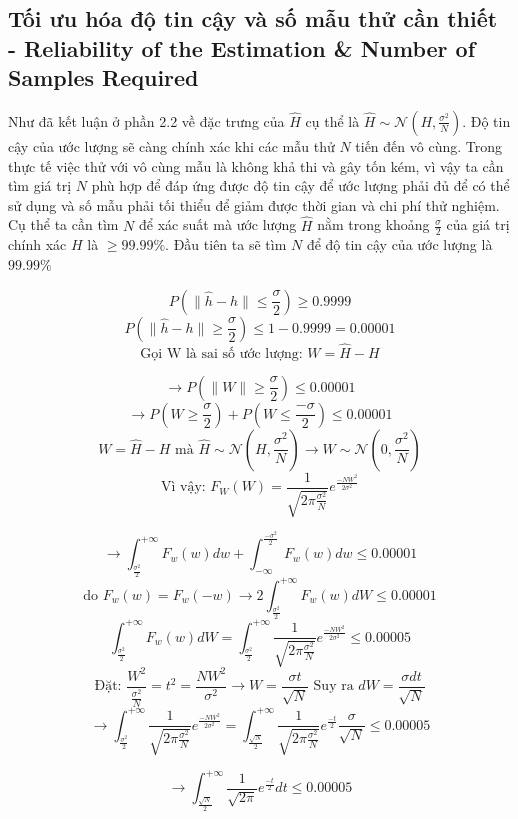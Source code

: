 \documentclass{article}
\begin{document}
\subsection{Tối ưu hóa độ tin cậy và số mẫu thử cần thiết  - Reliability of the Estimation \& Number of Samples Required}
Như đã kết luận ở phần 2.2 về đặc trưng của $\hat{H}$ cụ thể là $\hat{H} \sim \mathcal{N}(H,\frac{\sigma^2}{N})$. Độ tin cậy của ước lượng sẽ càng chính xác khi các mẫu thử $N$ tiến đến vô cùng. Trong thực tế việc thử với vô cùng mẫu là không khả thi và gây tốn kém, vì vậy ta cần tìm giá trị $N$ phù hợp để đáp ứng được độ tin cậy để ước lượng phải đủ để có thể sử dụng và số mẫu phải tối thiểu để giảm được thời gian và chi phí thử nghiệm. Cụ thể ta cần tìm $N$ để xác suất mà ước lượng $\hat{H}$ nằm trong khoảng $\frac{\sigma}{2}$ của giá trị chính xác $H$ là $\geq 99.99\%$. Đầu tiên ta sẽ tìm $N$ để độ tin cậy của ước lượng là $99.99\%$

$$P(\|\hat{h} - h\| \leq \frac{\sigma}{2}) \geq 0.9999$$
$$P(\|\hat{h} - h\| \geq \frac{\sigma}{2}) \leq 1 - 0.9999 = 0.00001$$
$$ \text{Gọi W là sai số ước lượng: } W = \hat{H} - H $$

$$\rightarrow P(\|W\| \geq \frac{\sigma}{2}) \leq 0.00001$$
$$\rightarrow P(W \geq \frac{\sigma}{2}) + P(W \leq \frac{-\sigma}{2}) \leq 0.00001$$
$$W = \hat{H} - H \text{ mà } \hat{H} \sim \mathcal{N}(H,\frac{\sigma^2}{N}) \rightarrow W \sim \mathcal{N}(0,\frac{\sigma^2}{N})$$
$$\text{Vì vậy: } F_W(W) = \frac{1}{ \sqrt{2\pi\frac{\sigma^2}{N} } } e^\frac{-NW^2}{2\sigma^2}$$

$$ \rightarrow \int_{\frac{\sigma^2}{2}}^{+\infty} F_w(w)dw + \int_{-\infty}^{\frac{-\sigma^2}{2}} F_w(w)dw \leq 0.00001$$
$$\text{do } F_w(w) = F_w(-w) \rightarrow 2\int_{\frac{\sigma^2}{2}}^{+\infty} F_w(w)dW \leq 0.00001$$
$$\int_{\frac{\sigma^2}{2}}^{+\infty} F_w(w)dW  = \int_{\frac{\sigma^2}{2}}^{+\infty}\frac{1}{ \sqrt{2\pi\frac{\sigma^2}{N} } } e^\frac{-NW^2}{2\sigma^2} \leq 0.00005$$
$$\text{Đặt: } \frac{W^2}{\frac{\sigma^2}{N}} = t^2 = \frac{NW^2}{\sigma^2} \rightarrow W = \frac{\sigma t}{\sqrt{N}} \text{ Suy ra } dW = \frac{\sigma dt}{\sqrt{N}}$$
$$\rightarrow \int_{\frac{\sigma^2}{2}}^{+\infty}\frac{1}{ \sqrt{2\pi\frac{\sigma^2}{N} } } e^\frac{-NW^2}{2\sigma^2} = \int_{\frac{\sqrt{N}}{2}}^{+\infty}\frac{1}{ \sqrt{2\pi\frac{\sigma^2}{N} } } e^\frac{-t}{2} \frac{\sigma}{\sqrt{N}} \leq 0.00005 $$

$$ \rightarrow \int_{\frac{\sqrt{N}}{2}}^{+\infty}\frac{1}{ \sqrt{2\pi}} e^\frac{-t}{2} dt \leq 0.00005 $$
\end{document}
